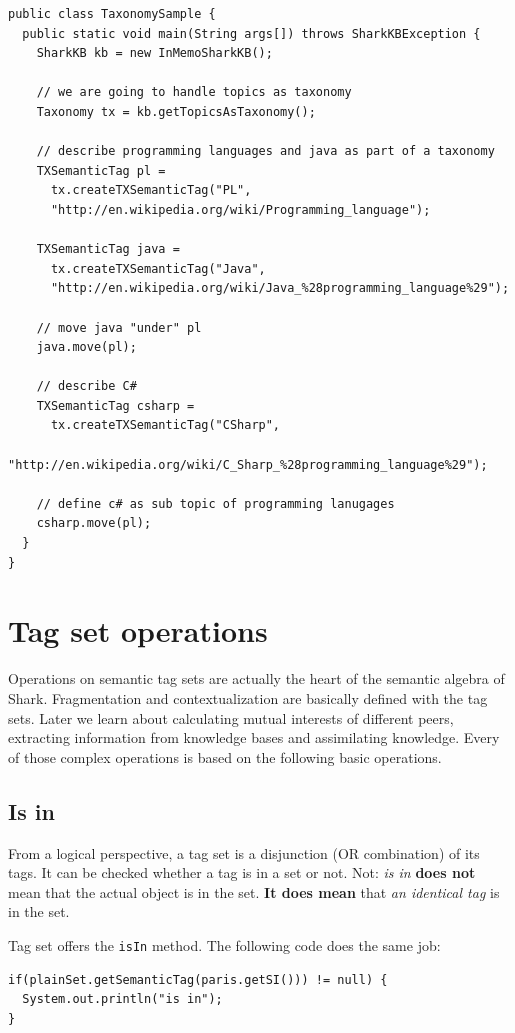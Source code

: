 \begin{verbatim}
public class TaxonomySample {
  public static void main(String args[]) throws SharkKBException {
    SharkKB kb = new InMemoSharkKB();
        
    // we are going to handle topics as taxonomy
    Taxonomy tx = kb.getTopicsAsTaxonomy();
        
    // describe programming languages and java as part of a taxonomy
    TXSemanticTag pl = 
      tx.createTXSemanticTag("PL", 
      "http://en.wikipedia.org/wiki/Programming_language");
    
    TXSemanticTag java = 
      tx.createTXSemanticTag("Java", 
      "http://en.wikipedia.org/wiki/Java_%28programming_language%29");
        
    // move java "under" pl
    java.move(pl);
        
    // describe C#
    TXSemanticTag csharp = 
      tx.createTXSemanticTag("CSharp", 
      "http://en.wikipedia.org/wiki/C_Sharp_%28programming_language%29");
        
    // define c# as sub topic of programming lanugages
    csharp.move(pl);
  }
}
\end{verbatim}

\section{Tag set operations}
Operations on semantic tag sets are actually the heart of the semantic algebra of Shark. Fragmentation and contextualization are basically defined with the tag sets. Later we learn about calculating mutual interests of different peers, extracting information from knowledge bases and assimilating knowledge. Every of those complex operations is based on the following basic operations.

\subsection{Is in}
From a logical perspective, a tag set is a disjunction (OR combination) of its tags. It can be checked whether a tag is in a set or not. Not: {\it is in} {\bf does not} mean that the actual object is in the set. {\bf It does mean} that {\it an identical tag} is in the set.

Tag set offers the {\tt isIn} method. The following code does the same job:

\begin{verbatim}
if(plainSet.getSemanticTag(paris.getSI())) != null) {
  System.out.println("is in");
}
\end{verbatim}

